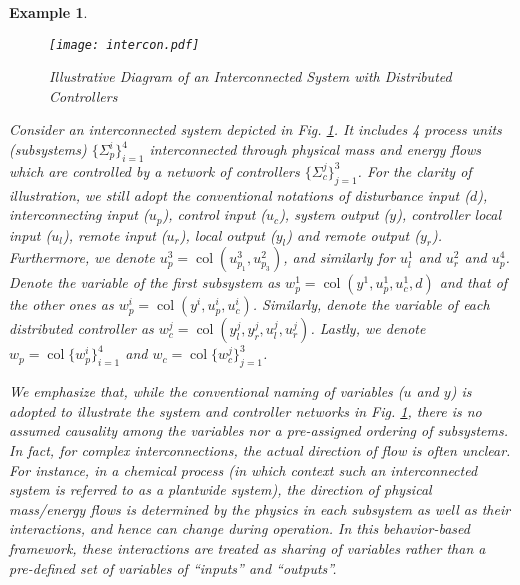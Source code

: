 \documentclass[11pt,print,draftcls,onecolumn,romanappendices]{ieeecolor}
\newtheorem{exmp}{Example}
\DeclareMathOperator{\col}{col}
\newcommand{\revise}[1]{{\color{black} #1}}
\begin{document}
\begin{exmp}\label{exmp:layout}
	\begin{figure}
		\centering
		\texttt{[image: intercon.pdf]}                                             
		\caption{Illustrative Diagram of an Interconnected System with Distributed Controllers}
		\label{fig:intercon}
	\end{figure}
	Consider an interconnected system depicted in Fig. \ref{fig:intercon}. It includes 4 process units (subsystems) $\{\Sigma_p^i\}_{i=1}^4$ interconnected through physical mass and energy flows which are controlled by a network of controllers $\{\Sigma_c^j\}_{j=1}^3$. For the clarity of illustration, we still adopt the conventional notations of disturbance input ($d$), interconnecting input ($u_p$), control input ($u_c$), system output ($y$), controller local input ($u_l$), remote input ($u_r$), local output ($y_l$) and remote output ($y_r$). \revise{Furthermore, we denote $u_p^3=\col(u_{p_1}^3,u_{p_3}^2)$, and similarly for $u_l^1$ and $u_r^2$ and $u_p^4$. Denote the variable of the first subsystem as $w_p^1=\col(y^1,u_p^1,u_c^1,d)$ and that of the other ones as $w_p^i=\col(y^i,u_p^i,u_c^i)$. Similarly, denote the variable of each distributed controller as $w_c^j=\col(y_l^j,y_r^j,u_l^j,u_r^j)$. Lastly, we denote $w_p=\col\{w_p^i\}_{i=1}^4$ and $w_c=\col\{w_c^j\}_{j=1}^3$.}
	
	We emphasize that, \revise{while the conventional naming of variables ($u$ and $y$) is adopted to illustrate the system and controller networks in Fig. \ref{fig:intercon}}, there is no assumed causality among the variables nor a pre-assigned ordering of subsystems. In fact, for complex interconnections, the actual direction of flow is often unclear. For instance, in a chemical process (in which context such an interconnected system is referred to as a plantwide system), the direction of physical mass/energy flows is determined by the physics in each subsystem as well as their interactions, and hence can change during operation. In this behavior-based framework, these interactions are treated as sharing of variables rather than a pre-defined set of variables of ``inputs'' and  ``outputs''. 
	

\end{exmp}
\end{document}
